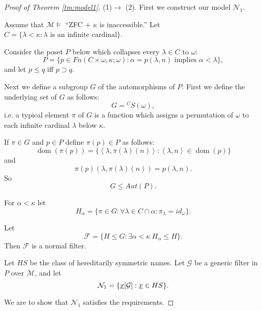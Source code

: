 \documentclass[a4paper,10pt,reqno]{amsart}
\numberwithin{equation}{section}
\theoremstyle{definition}
\theoremstyle{remark}
\newcommand{\mc}[1]{\mathcal{#1}}
\newcommand{\dom}{\operatorname{dom}}
\def\<{\left\langle}
\def\>{\right\rangle}
\begin{document}
\begin{proof}[Proof of Theorem \ref{tm:model1}]
(1)$\to$ (2). 
    First we construct our model $\mc N_1$.

Assume that $\mc M\models$ ``ZFC + ${\kappa}$ is inaccessible.''
    Let $C=\{{\lambda}<{\kappa}:{\lambda}\text{ is an infinite cardinal}\}$.

Consider the poset $P$ below which collapses every ${\lambda}\in C$ to ${\omega}$:  
\begin{displaymath}
P=\{p\in Fn(C\times {\omega},{\kappa};{\omega}): {\alpha}=p({\lambda},n) \text{ implies }{\alpha}<{\lambda}\},
\end{displaymath}
and let  $p\le q$ iff $p\supset q$.

Next we define a subgroup $G$ of the automorphisms of $P$.
First we define the underlying set of $G$ as follows:
\begin{displaymath}
G={}^CS({\omega}),
\end{displaymath}
i.e. a typical element ${\pi}$ of $G$ is a function which 
assigns a permutation of ${\omega}$ to each infinite cardinal  ${\lambda}$ below ${\kappa}$.
 
If  ${\pi}\in G$ and  $p\in P$ 
define ${\pi}(p)\in P$ as follows:
$$\dom({\pi}(p))=\{ \<{\lambda},{\pi}({\lambda})(n)\>:\<{\lambda},n\>\in \dom(p)\}$$ and     
\begin{displaymath}
    {\pi}(p)({\lambda},{\pi}({\lambda})(n))=p({\lambda},n).
\end{displaymath}
So 
\begin{displaymath}
G\le Aut(P).
\end{displaymath}

For ${\alpha}<{\kappa}$ let
\begin{displaymath}
H_{\alpha}=\{{\pi}\in G: \forall {\lambda}\in C\cap {\alpha}: {\pi}_{\lambda}=id_{\omega}\}.
\end{displaymath}

Let 
\begin{displaymath}
\mc F=\{H\le G: \exists {\alpha}<{\kappa}\ H_{\alpha}\le H \}.
\end{displaymath}
Then 
$\mc F$ is a normal filter. 

Let $HS$ be the class of hereditarily  symmetric names.
Let $\mc G$ be a generic filter in $P$ over $\mc M$, 
and   let 
$$\mc N_1=\{\KKGU x: \underline{x}\in HS\}.$$

We are to show that $\mc N_1$ satisfies the requirements. 


\end{proof}
\end{document}
